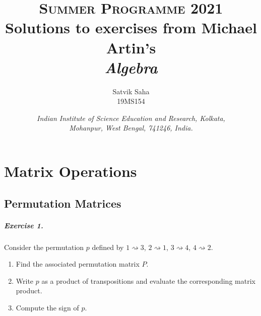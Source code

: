 \documentclass[11pt]{report}
\title{
    \Large\textsc{Summer Programme 2021} \\
    \vspace{10pt}
    \huge Solutions to exercises from Michael Artin's \\
    \textit{Algebra}
}
\author{
    \large Satvik Saha%
    \\\textsc{\small 19MS154}
}
\date{\normalsize
    \textit{Indian Institute of Science Education and Research, Kolkata, \\
    Mohanpur, West Bengal, 741246, India.} \\
}
\theoremstyle{remark}
\begin{document}
    \maketitle
    \tableofcontents

    \chapter{Matrix Operations}
    \setcounter{section}{3}
    \section{Permutation Matrices}

    \paragraph{Exercise 1.} Consider the permutation $p$ defined by
    $1\rightsquigarrow 3$, $2\rightsquigarrow 1$, $3\rightsquigarrow 4$,
    $4\rightsquigarrow 2$.
    \begin{enumerate}
        \itemsep0em 
        \item Find the associated permutation matrix $P$.
        \item Write $p$ as a product of transpositions and evaluate the
        corresponding matrix product.
        \item Compute the sign of $p$.
    \end{enumerate}
\end{document}
